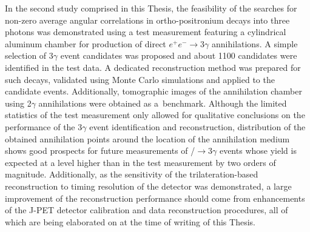 In the second study comprised in this Thesis, the feasibility of the searches for non-zero average angular correlations in ortho-positronium decays into three photons was demonstrated using a test measurement featuring a cylindrical aluminum chamber for production of direct $e^+e^-\to 3\gamma$ annihilations. A simple selection of 3$\gamma$ event candidates was proposed and about 1100 candidates were identified in the test data. A dedicated reconstruction method was prepared for such decays, validated using Monte Carlo simulations and applied to the candidate events. Additionally, tomographic images of the annihilation chamber using 2$\gamma$ annihilations were obtained as a~benchmark. Although the limited statistics of the test measurement only allowed for qualitative conclusions on the performance of the 3$\gamma$ event identification and reconstruction, distribution of the obtained annihilation points around the location of the annihilation medium shows good prospects for future measurements of \ops/$\to 3\gamma$ events whose yield is expected at a level higher than in the test measurement by two orders of magnitude. Additionally, as the sensitivity of the trilateration-based reconstruction to timing resolution of the detector was demonstrated, a large improvement of the reconstruction performance should come from enhancements of the J-PET detector calibration and data reconstruction procedures, all of which are being elaborated on at the time of writing of this Thesis.


